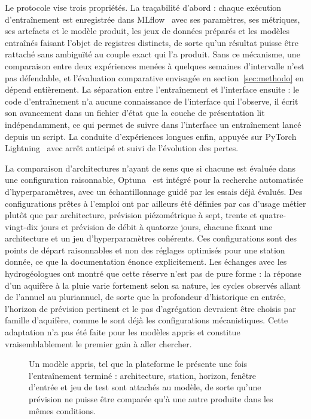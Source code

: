 Le protocole vise trois propriétés. La traçabilité d'abord : chaque exécution d'entraînement est enregistrée dans MLflow~\cite{mlflow} avec ses paramètres, ses métriques, ses artefacts et le modèle produit, les jeux de données préparés et les modèles entraînés faisant l'objet de registres distincts, de sorte qu'un résultat puisse être rattaché sans ambiguïté au couple exact qui l'a produit. Sans ce mécanisme, une comparaison entre deux expériences menées à quelques semaines d'intervalle n'est pas défendable, et l'évaluation comparative envisagée en section~\ref{sec:methodo} en dépend entièrement. La séparation entre l'entraînement et l'interface ensuite : le code d'entraînement n'a aucune connaissance de l'interface qui l'observe, il écrit son avancement dans un fichier d'état que la couche de présentation lit indépendamment, ce qui permet de suivre dans l'interface un entraînement lancé depuis un script. La conduite d'expériences longues enfin, appuyée sur PyTorch Lightning~\cite{pytorch_lightning} avec arrêt anticipé et suivi de l'évolution des pertes.

La comparaison d'architectures n'ayant de sens que si chacune est évaluée dans une configuration raisonnable, Optuna~\cite{optuna} est intégré pour la recherche automatisée d'hyperparamètres, avec un échantillonnage guidé par les essais déjà évalués. Des configurations prêtes à l'emploi ont par ailleurs été définies par cas d'usage métier plutôt que par architecture, prévision piézométrique à sept, trente et quatre-vingt-dix jours et prévision de débit à quatorze jours, chacune fixant une architecture et un jeu d'hyperparamètres cohérents. Ces configurations sont des points de départ raisonnables et non des réglages optimisés pour une station donnée, ce que la documentation énonce explicitement. Les échanges avec les hydrogéologues ont montré que cette réserve n'est pas de pure forme : la réponse d'un aquifère à la pluie varie fortement selon sa nature, les cycles observés allant de l'annuel au pluriannuel, de sorte que la profondeur d'historique en entrée, l'horizon de prévision pertinent et le pas d'agrégation devraient être choisis par famille d'aquifère, comme le sont déjà les configurations mécanistiques. Cette adaptation n'a pas été faite pour les modèles appris et constitue vraisemblablement le premier gain à aller chercher.

\begin{figure}[H]
\centering
{}
\caption{Un modèle appris, tel que la plateforme le présente une fois l'entraînement terminé : architecture, station, horizon, fenêtre d'entrée et jeu de test sont attachés au modèle, de sorte qu'une prévision ne puisse être comparée qu'à une autre produite dans les mêmes conditions. \lecas}
\label{fig:st32-apprentissage}
\end{figure}


